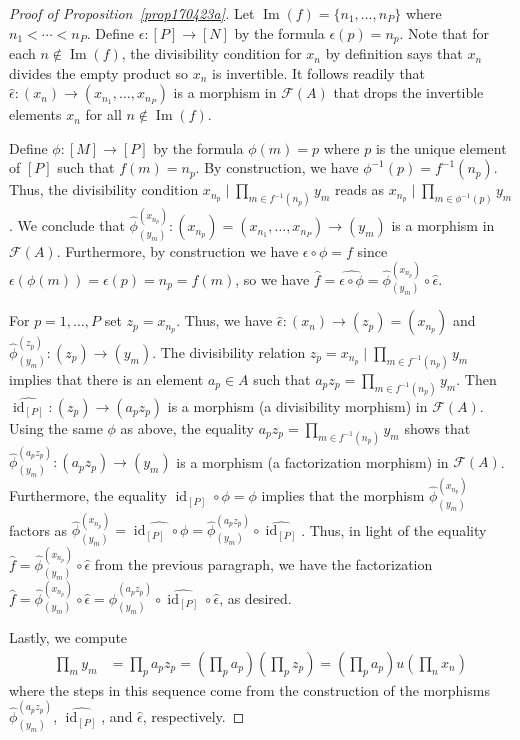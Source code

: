 \documentclass[reqno]{amsart}
\theoremstyle{plain}
\theoremstyle{definition}
\newcommand{\cat}[1]{\mathcal{#1}}
\newcommand{\catf}{\cat{F}}
\newcommand{\id}{\operatorname{id}}
\newcommand{\im}{\operatorname{Im}}
\numberwithin{equation}{lem}
\begin{document}
\begin{proof}[Proof of Proposition~\ref{prop170423a}]
Let $\im(f)=\{n_1,\ldots,n_P\}$ where $n_1<\cdots<n_P$.
Define $\epsilon\colon[P]\to[N]$ by the formula $\epsilon(p)=n_p$.
Note that for each $n\notin\im(f)$, the divisibility condition for $x_n$ by definition says that $x_n$ divides the empty product
so $x_n$ is invertible. 
It follows readily that $\hat\epsilon\colon(x_n)\to(x_{n_1},\ldots,x_{n_P})$ is a morphism in $\catf(A)$
that drops the invertible elements $x_n$ for all $n\notin\im(f)$.

Define $\phi\colon[M]\to[P]$ by the formula $\phi(m)=p$ where $p$ is the unique element of $[P]$ such that $f(m)=n_p$.
By construction, we have $\phi^{-1}(p)=f^{-1}(n_p)$.
Thus, the divisibility condition $x_{n_p}\mid\prod_{m\in f^{-1}(n_p)}y_m$ reads as
$x_{n_p}\mid\prod_{m\in\phi^{-1}(p)}y_m$.
We conclude that $\hat\phi^{(x_{n_p})}_{(y_m)}\colon(x_{n_p})=(x_{n_1},\ldots,x_{n_P})\to(y_m)$ is a morphism in $\catf(A)$.
Furthermore, by construction we have $\epsilon\circ\phi=f$ since $\epsilon(\phi(m))=\epsilon(p)=n_p=f(m)$,
so we have $\hat f=\widehat{\epsilon\circ\phi}=\hat\phi^{(x_{n_p})}_{(y_m)}\circ\hat\epsilon$.

For $p=1,\ldots,P$ set $z_p=x_{n_p}$.
Thus, we have $\hat\epsilon\colon(x_n)\to(z_p)=(x_{n_p})$ and
$\hat\phi^{(z_{p})}_{(y_m)}\colon(z_p)\to(y_m)$.
The divisibility relation $z_p=x_{n_p}\mid\prod_{m\in f^{-1}(n_p)}y_m$ implies that there is an element $a_p\in A$ such that
$a_pz_p=\prod_{m\in f^{-1}(n_p)}y_m$.
Then $\widehat{\id_{[P]}}\colon(z_p)\to(a_pz_p)$ is a morphism (a divisibility morphism) in $\catf(A)$.
Using the same $\phi$ as above, the equality $a_pz_p=\prod_{m\in f^{-1}(n_p)}y_m$ shows that
$\hat\phi^{(a_pz_p)}_{(y_m)}\colon(a_pz_p)\to(y_m)$ is a morphism (a factorization morphism) in $\catf(A)$.
Furthermore, the equality $\id_{[P]}\circ\phi=\phi$ implies that the morphism $\hat\phi^{(x_{n_p})}_{(y_m)}$
factors as $\hat\phi^{(x_{n_p})}_{(y_m)}=\widehat{\id_{[P]}\circ\phi}=\hat\phi^{(a_pz_p)}_{(y_m)}\circ\widehat{\id_{[P]}}$.
Thus, in light of the equality $\hat f=\hat\phi^{(x_{n_p})}_{(y_m)}\circ\hat\epsilon$ from the previous paragraph,
we have the factorization
$\hat f=\hat\phi^{(x_{n_p})}_{(y_m)}\circ\hat\epsilon=\hat\phi^{(a_pz_p)}_{(y_m)}\circ\widehat{\id_{[P]}}\circ\hat\epsilon$, as desired.

Lastly, we compute 
\begin{align*}
\textstyle\prod_my_m
&\textstyle=\prod_pa_pz_p
=\left(\prod_pa_p\right)\left(\prod_pz_p\right)
=\left(\prod_pa_p\right)u\left(\prod_nx_n\right)
\end{align*}
where the steps in this sequence come from the construction of the morphisms $\hat\phi^{(a_pz_p)}_{(y_m)}$, $\widehat{\id_{[P]}}$,
and $\hat\epsilon$, respectively.
\end{proof}
\end{document}
